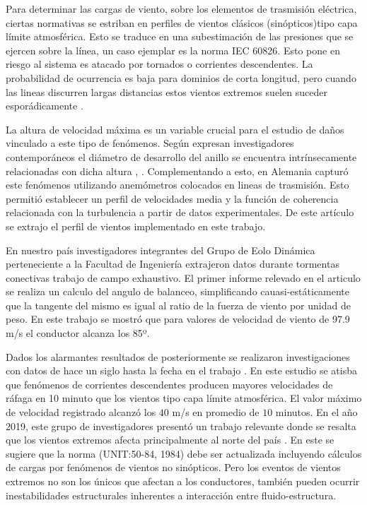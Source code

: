 Para determinar las cargas de viento, sobre los elementos de trasmisión eléctrica, ciertas normativas se estriban en perfiles de vientos clásicos (sinópticos)tipo capa límite atmosférica. Esto se traduce en una subestimación de las presiones que se ejercen sobre la línea, un caso ejemplar es la norma IEC 60826. Esto pone en riesgo al sistema es atacado por tornados o corrientes descendentes. La probabilidad de ocurrencia es baja para dominios de corta longitud, pero cuando las lineas discurren largas distancias estos vientos extremos suelen suceder esporádicamente \textcite{ang1984probability}. 

La altura de velocidad máxima es un variable crucial para el estudio de daños vinculado a este tipo de fenómenos. Según expresan investigadores contemporáneos el diámetro de desarrollo del anillo se encuentra intrínsecamente relacionadas con dicha altura  \textcite{holmes2002re}, \cite{abd2013coupled}. Complementando a esto, \textcite{stengel2017measurements} en Alemania capturó este fenómenos utilizando anemómetros colocados en lineas de trasmisión. Esto permitió establecer un perfil de velocidades media y la función de coherencia relacionada con la turbulencia a partir de datos experimentales. De este artículo se extrajo el perfil de vientos implementado en este trabajo.

En nuestro país investigadores integrantes del Grupo de Eolo Dinámica perteneciente a la Facultad de Ingeniería extrajeron datos durante tormentas conectivas trabajo de campo exhaustivo. El primer informe relevado en el articulo \cite{duranona2009analysis} se realiza un calculo del angulo de balanceo, simplificando cauasi-estáticamente que la tangente del mismo es igual al ratio de la fuerza de viento por unidad de peso. En este trabajo se mostró que para valores de velocidad de viento de 97.9 m/s el conductor alcanza los 85º.

 Dados los alarmantes resultados de \cite{duranona2009analysis} posteriormente se realizaron investigaciones con datos de hace un siglo  hasta la fecha en el trabajo \citep{duranona2015significance}. En este estudio se atisba que fenómenos de corrientes descendentes producen mayores velocidades de ráfaga en 10 minuto que los vientos tipo capa límite atmosférica. El valor máximo de velocidad registrado alcanzó los $40$ m/s en promedio de $10$ minutos. En el año 2019, este grupo de investigadores presentó un trabajo relevante donde se resalta que los vientos extremos afecta principalmente al norte del país \textcite{duranona2019first}. En este se sugiere que la norma (UNIT:50-84, 1984) debe ser actualizada incluyendo cálculos de cargas por fenómenos de vientos no sinópticos. Pero los eventos de vientos extremos no son los únicos que afectan a los conductores, también pueden ocurrir inestabilidades estructurales inherentes a interacción entre fluido-estructura. 

